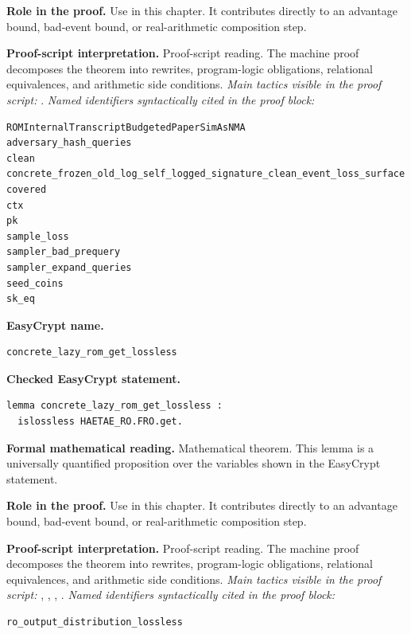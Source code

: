 \begin{formaltheorem}
\noindent\textbf{Role in the proof.}
Use in this chapter. It contributes directly to an advantage bound, bad-event bound, or real-arithmetic composition step.

\noindent\textbf{Proof-script interpretation.}
Proof-script reading. The machine proof decomposes the theorem into rewrites, program-logic obligations, relational equivalences, and arithmetic side conditions.
\emph{Main tactics visible in the proof script:} .
\emph{Named identifiers syntactically cited in the proof block:}
\begin{lstlisting}[language=EasyCrypt,basicstyle=\ttfamily\scriptsize]
ROMInternalTranscriptBudgetedPaperSimAsNMA
adversary_hash_queries
clean
concrete_frozen_old_log_self_logged_signature_clean_event_loss_surface
covered
ctx
pk
sample_loss
sampler_bad_prequery
sampler_expand_queries
seed_coins
sk_eq
\end{lstlisting}

\end{formaltheorem}

\begin{formaltheorem}
\noindent\textbf{EasyCrypt name.}
\begin{lstlisting}[language=EasyCrypt,basicstyle=\ttfamily\scriptsize]
concrete_lazy_rom_get_lossless
\end{lstlisting}
\noindent\textbf{Checked EasyCrypt statement.}
\begin{lstlisting}[language=EasyCrypt,basicstyle=\ttfamily\scriptsize]
lemma concrete_lazy_rom_get_lossless :
  islossless HAETAE_RO.FRO.get.
\end{lstlisting}
\noindent\textbf{Formal mathematical reading.}
Mathematical theorem. This lemma is a universally quantified proposition over the variables shown in the EasyCrypt statement.

\noindent\textbf{Role in the proof.}
Use in this chapter. It contributes directly to an advantage bound, bad-event bound, or real-arithmetic composition step.

\noindent\textbf{Proof-script interpretation.}
Proof-script reading. The machine proof decomposes the theorem into rewrites, program-logic obligations, relational equivalences, and arithmetic side conditions.
\emph{Main tactics visible in the proof script:} , , , .
\emph{Named identifiers syntactically cited in the proof block:}
\begin{lstlisting}[language=EasyCrypt,basicstyle=\ttfamily\scriptsize]
ro_output_distribution_lossless
\end{lstlisting}

\end{formaltheorem}

